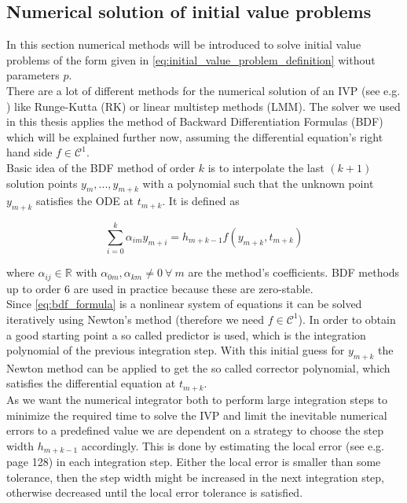 \documentclass{scrartcl}[12pt, halfparskip]
\numberwithin{equation}{section}
\numberwithin{figure}{section}
\numberwithin{table}{section}
\begin{document}
\subsection{Numerical solution of initial value problems}
\label{sec:theory_ODE_solver_BDF}

In this section numerical methods will be introduced to solve initial value problems of the form given in \cref{eq:initial_value_problem_definition} without parameters $p$. \\ 
There are a lot of different methods for the numerical solution of an IVP (see e.g. \cite{diff_equations_numerics}) like Runge-Kutta (RK) or linear multistep methods (LMM). The solver we used in this thesis applies the method of Backward Differentiation Formulas (BDF) which will be explained further now, assuming the differential equation's right hand side $f \in \mathcal{C}^1$. \\
Basic idea of the BDF method of order $k$ is to interpolate the last $(k+1)$ solution points $y_m,...,y_{m+k}$ with a polynomial such that the unknown point $y_{m+k}$ satisfies the ODE at $t_{m+k}$. 
It is defined as

\begin{equation}
	\sum_{i=0}^{k} \alpha_{im} y_{m+i} = h_{m+k-1} f(y_{m+k},t_{m+k})
	\label{eq:bdf_formula}
\end{equation}

where $\alpha_{ij} \in \mathbb{R}$ with $\alpha_{0m},\alpha_{km} \ne 0 \ \forall \ m$ are the method's coefficients. BDF methods up to order 6 are used in practice because these are zero-stable. \\
Since \cref{eq:bdf_formula} is a nonlinear system of equations it can be solved iteratively using Newton's method (therefore we need $f \in \mathcal{C}^1$). In order to obtain a good starting point a so called predictor is used, which is the integration polynomial of the previous integration step. With this initial guess for $y_{m+k}$ the Newton method can be applied to get the so called corrector polynomial, which satisfies the differential equation at $t_{m+k}$. \\
As we want the numerical integrator both to perform large integration steps to minimize the required time to solve the IVP and limit the inevitable numerical errors to a predefined value we are dependent on a strategy to choose the step width $h_{m+k-1}$ accordingly. This is done by estimating the local error (see e.g. \cite{diss_jan} page 128) in each integration step. Either the local error is smaller than some tolerance, then the step width might be increased in the next integration step, otherwise decreased until the local error tolerance is satisfied. \\
\end{document}
